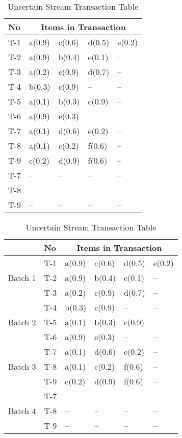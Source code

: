 \documentclass{article}
\begin{document}
\begin{table}
\centering

\begin{tabular}{|l|l|l|l|l|}
\hline
No & \multicolumn{4}{c|}{Items in Transaction} \\ \hline \hline
	T-1 & a(0.9) & c(0.6) & d(0.5) & e(0.2)\\\hline
	T-2 & a(0.9) & b(0.4) & e(0.1) & --    \\\hline
	T-3 & a(0.2) & c(0.9) & d(0.7) & --    \\\hline
	T-4 & b(0.3) & c(0.9) & -- & --\\\hline
	T-5 & a(0.1) & b(0.3) & c(0.9) & --    \\\hline
	T-6 & a(0.9) & e(0.3) & -- & --        \\\hline
   	T-7 & a(0.1) & d(0.6) & e(0.2) & --    \\\hline
	T-8 & a(0.1) & c(0.2) & f(0.6) & --    \\\hline
	T-9 & c(0.2) & d(0.9) & f(0.6) & --    \\\hline

	T-7 &  --  &  --  &  --  & --    \\\hline
	T-8 &  --  &  --  &  --  & --    \\\hline
	T-9 &  --  &  --  &  --  & --    \\\hline
\end{tabular}
\caption{Uncertain Stream Transaction Table}

\end{table}


\begin{table}
\centering

\begin{tabular}{|l|l|l|l|l|l|}
\hline
& No & \multicolumn{4}{c|}{Items in Transaction} \\ \hline \hline
\multirow{3}{*}{Batch 1}	&	T-1 & a(0.9) & c(0.6) & d(0.5) & e(0.2)\\\cline{2-6}
							&	T-2 & a(0.9) & b(0.4) & e(0.1) & --    \\\cline{2-6}
							&	T-3 & a(0.2) & c(0.9) & d(0.7) & --    \\\hline
\multirow{3}{*}{Batch 2}			&	T-4 & b(0.3) & c(0.9) & -- & --\\\cline{2-6}
							&	T-5 & a(0.1) & b(0.3) & c(0.9) & --    \\\cline{2-6}
							&	T-6 & a(0.9) & e(0.3) & -- & --        \\\hline
\multirow{3}{*}{Batch 3}			&	T-7 & a(0.1) & d(0.6) & e(0.2) & --    \\\cline{2-6}
							&	T-8 & a(0.1) & c(0.2) & f(0.6) & --    \\\cline{2-6}
							&	T-9 & c(0.2) & d(0.9) & f(0.6) & --    \\\hline
							
\multirow{3}{*}{Batch 4}	&	T-7 &  --  &  --  &  --  & --    \\\cline{2-6}
							&	T-8 &  --  &  --  &  --  & --    \\\cline{2-6}
							&	T-9 &  --  &  --  &  --  & --    \\\hline
\end{tabular}
\caption{Uncertain Stream Transaction Table}

\end{table}
\end{document}
